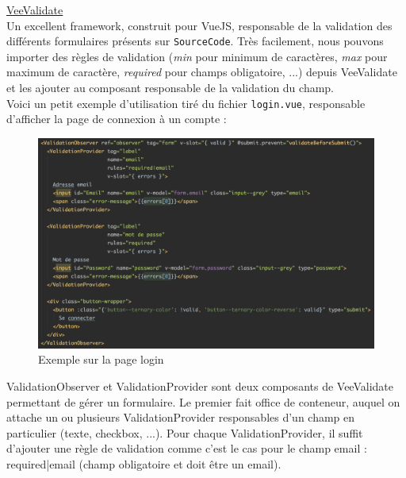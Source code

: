 \pagebreak
{}

\noindent\underline{\href{https://logaretm.github.io/vee-validate/}{VeeValidate}}\\

Un excellent framework, construit pour VueJS, responsable de la validation des différents formulaires présents sur \texttt{SourceCode}. Très facilement, nous pouvons importer des règles de validation (\textit{min} pour minimum de caractères, \textit{max} pour maximum de caractère, \textit{required} pour champs obligatoire, ...) depuis VeeValidate et les ajouter au composant responsable de la validation du champ.\\

Voici un petit exemple d'utilisation tiré du fichier \texttt{login.vue}, responsable d'afficher la page de connexion à un compte :\\

\begin{figure}[H]
    \includegraphics[width=\textwidth,height=0.35\textheight,keepaspectratio]{images/libraries/veevalidate.png}
    \centering
    \caption[VeeValidate : Exemple d'utilisation]{Exemple sur la page login}
\end{figure}

ValidationObserver et ValidationProvider sont deux composants de VeeValidate permettant de gérer un formulaire. Le premier fait office de conteneur, auquel on attache un ou plusieurs ValidationProvider responsables d'un champ en particulier (texte, checkbox, ...). Pour chaque ValidationProvider, il suffit d'ajouter une règle de validation comme c'est le cas pour le champ email : required|email (champ obligatoire et doit être un email).\\


